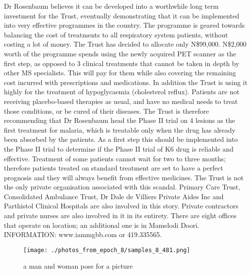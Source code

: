 \documentclass{article}%
\begin{document}
Dr Rosenbaum believes it can be developed into a worthwhile long term investment for the Trust, eventually demonstrating that it can be implemented into very effective programmes in the country. The programme is geared towards balancing the cost of treatments to all respiratory system patients, without costing a lot of money. The Trust has decided to allocate only N\$99,000. N\$2,000 worth of the programme spends using the newly acquired PET scanner as the first step, as opposed to 3 clinical treatments that cannot be taken in depth by other MS specialists. This will pay for them while also covering the remaining cost incurred with prescriptions and medications. In addition the Trust is using it highly for the treatment of hypoglycaemia (cholesterol reflux). Patients are not receiving placebo{-}based therapies as usual, and have no medical needs to treat those conditions, or be cured of their diseases.\newline%
The Trust is therefore recommending that Dr Rosenbaum head the Phase II trial on 4 lesions as the first treatment for malaria, which is treatable only when the drug has already been absorbed by the patients. As a first step this should be implemented into the Phase II trial to determine if the Phase II trial of K6 drug is reliable and effective. Treatment of some patients cannot wait for two to three months; therefore patients treated on standard treatment are set to have a perfect prognosis and they will always benefit from effective medicines.\newline%
The Trust is not the only private organisation associated with this scandal. Primary Care Trust, Consolidated Ambulance Trust, Dr Dale de Villiers Private Aides Inc and Parthistol Clinical Hospitals are also involved in this story. Private contractors and private nurses are also involved in it in its entirety.\newline%
There are eight offices that operate on location; an additional one is in Mamelodi Doori.\newline%
INFORMATION: www.iammgbb.com or 419.335565.\newline%

%


\begin{figure}[h!]%
\centering%
\texttt{[image: ./photos\_from\_epoch\_8/samples\_8\_481.png]}%
\caption{a man and woman pose for a picture}%
\end{figure}

%
\end{document}
